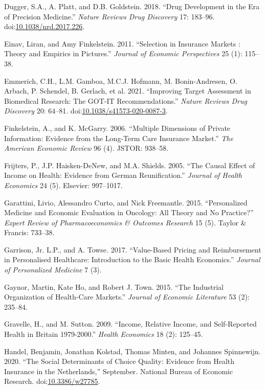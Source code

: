 \documentclass[a4paper,12pt]{article}
\begin{document}
\hypertarget{citeproc_bib_item_11}{Dugger, S.A., A. Platt, and D.B. Goldstein. 2018. “Drug Development in the Era of Precision Medicine.” \textit{Nature Reviews Drug Discovery} 17: 183–96. doi:\href{https://doi.org/10.1038/nrd.2017.226}{10.1038/nrd.2017.226}.}

\hypertarget{citeproc_bib_item_12}{Einav, Liran, and Amy Finkelstein. 2011. “Selection in Insurance Markets : Theory and Empirics in Pictures.” \textit{Journal of Economic Perspectives} 25 (1): 115–38.}

\hypertarget{citeproc_bib_item_13}{Emmerich, C.H., L.M. Gamboa, M.C.J. Hofmann, M. Bonin-Andresen, O. Arbach, P. Schendel, B. Gerlach, et al. 2021. “Improving Target Assessment in Biomedical Research: The GOT-IT Recommendations.” \textit{Nature Reviews Drug Discovery} 20: 64–81. doi:\href{https://doi.org/10.1038/s41573-020-0087-3}{10.1038/s41573-020-0087-3}.}

\hypertarget{citeproc_bib_item_14}{Finkelstein, A., and K. McGarry. 2006. “Multiple Dimensions of Private Information: Evidence from the Long-Term Care Insurance Market.” \textit{The American Economic Review} 96 (4). JSTOR: 938–58.}

\hypertarget{citeproc_bib_item_15}{Frijters, P., J.P. Haisken-DeNew, and M.A. Shields. 2005. “The Causal Effect of Income on Health: Evidence from German Reunification.” \textit{Journal of Health Economics} 24 (5). Elsevier: 997–1017.}

\hypertarget{citeproc_bib_item_16}{Garattini, Livio, Alessandro Curto, and Nick Freemantle. 2015. “Personalized Medicine and Economic Evaluation in Oncology: All Theory and No Practice?” \textit{Expert Review of Pharmacoeconomics \& Outcomes Research} 15 (5). Taylor \& Francis: 733–38.}

\hypertarget{citeproc_bib_item_17}{Garrison, Jr. L.P., and A. Towse. 2017. “Value-Based Pricing and Reimbursement in Personalised Healthcare: Introduction to the Basic Health Economics.” \textit{Journal of Personalized Medicine} 7 (3).}

\hypertarget{citeproc_bib_item_18}{Gaynor, Martin, Kate Ho, and Robert J. Town. 2015. “The Industrial Organization of Health-Care Markets.” \textit{Journal of Economic Literature} 53 (2): 235–84.}

\hypertarget{citeproc_bib_item_19}{Gravelle, H., and M. Sutton. 2009. “Income, Relative Income, and Self-Reported Health in Britain 1979-2000.” \textit{Health Economics} 18 (2): 125–45.}

\hypertarget{citeproc_bib_item_20}{Handel, Benjamin, Jonathan Kolstad, Thomas Minten, and Johannes Spinnewijn. 2020. “The Social Determinants of Choice Quality: Evidence from Health Insurance in the Netherlands,” September. National Bureau of Economic Research. doi:\href{https://doi.org/10.3386/w27785}{10.3386/w27785}.}
\end{document}
